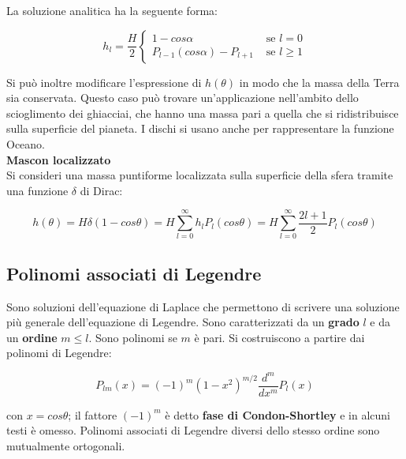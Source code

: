 \documentclass[a4paper,12pt]{book}
\begin{document}
\noindent
La soluzione analitica ha la seguente forma:

\begin{equation}
    h_l = \frac{H}{2} \begin{cases}
        1 - cos \alpha & \text{ se } l = 0 \\ P_{l-1} (cos \alpha) - P_{l+1} & \text{ se } l \ge 1
    \end{cases}
\end{equation}

\noindent Si può inoltre modificare l'espressione di $h(\theta)$ in modo che la massa della Terra sia conservata.
Questo caso può trovare un'applicazione nell'ambito dello scioglimento dei ghiacciai, che hanno una massa pari a quella che si ridistribuisce sulla superficie del pianeta.
I dischi si usano anche per rappresentare la funzione Oceano.\\

\noindent
\textcolor{colore4}{\textbf{Mascon localizzato}}\\

\noindent
Si consideri una massa puntiforme localizzata sulla superficie della sfera tramite una funzione $\delta$ di Dirac:

\begin{equation}
    h(\theta) = H \delta (1 - cos \theta) = H \sum_{l=0}^\infty h_l P_l (cos \theta) = H \sum_{l=0}^\infty \frac{2l+1}{2} P_l (cos \theta)
\end{equation}

\subsection{\textcolor{colore7}{Polinomi associati di Legendre}}

Sono soluzioni dell'equazione di Laplace che permettono di scrivere una soluzione più generale dell'equazione di Legendre.
Sono caratterizzati da un \textbf{grado} $l$ e da un \textbf{ordine} $m \le l$.
Sono polinomi se $m$ è pari.
Si costruiscono a partire dai polinomi di Legendre:

\begin{equation}
    P_{lm} (x) = (-1)^m (1 - x^2)^{m/2} \frac{d^m}{dx^m} P_l (x)
    \label{eq:polinomi_associati_legendre}
\end{equation}

\noindent
con $x = cos \theta$; il fattore $(-1)^m$ è detto \textbf{fase di Condon-Shortley} e in alcuni testi è omesso.
Polinomi associati di Legendre diversi dello stesso ordine sono mutualmente ortogonali.\\
\end{document}
